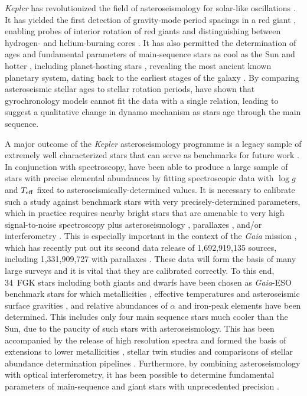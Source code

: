 \documentclass[a4paper,fleqn,usenatbib]{mnras}
\newcommand{\teff}{\mbox{$T_{\rm eff}$}\xspace}
\newcommand{\logg}{\mbox{$\log g$}\xspace}
\newcommand{\kepler}{\emph{Kepler}\xspace}
\newcommand{\gaia}{\emph{Gaia}\xspace}
\begin{document}
\kepler has revolutionized the field of asteroseismology for solar-like oscillations \citep{2010PASP..122..131G}. It has yielded the first detection of gravity-mode period spacings in a red giant \citep{rggmodes}, enabling probes of interior rotation of red giants \citep{rggmoderotation} and distinguishing between hydrogen- and helium-burning cores \citep{rggmodehelium}. It has also permitted the determination of ages and fundamental parameters of main-sequence stars as cool as the Sun and hotter \citep{silvaages}, including planet-hosting stars \citep{huberplanetages,silvaplanetages,2018MNRAS.479.4786V}, revealing the most ancient known planetary system, dating back to the earliest stages of the galaxy \citep{ancientplanets}. By comparing asteroseismic stellar ages to stellar rotation periods, \citet{angusgyro} have shown that gyrochronology models cannot fit the data with a single relation, leading \citet{vansadersgyro} to suggest a qualitative change in dynamo mechanism as stars age through the main sequence. 

A major outcome of the \kepler asteroseismology programme is a legacy sample of extremely well characterized stars that can serve as benchmarks for future work \citep{keplerlegacy1,keplerlegacy2}. In conjunction with spectroscopy, \citet{hawkinsapogee} have been able to produce a large sample of stars with precise elemental abundances by fitting spectroscopic data with \logg and \teff fixed to asteroseismically-determined values. It is necessary to calibrate such a study against benchmark stars with very precisely-determined parameters, which in practice requires nearby bright stars that are amenable to very high signal-to-noise spectroscopy plus asteroseismology \citep{creeveybenchmark}, parallaxes \citep{hawkinsbenchmarks}, and/or interferometry \citep{casagrandebenchmark,creeveybenchmark2}. This is especially important in the context of the \gaia mission \citep{gaia}, which has recently put out its second data release of 1,692,919,135 sources, including 1,331,909,727 with parallaxes \citep{gaiadr2}. These data will form the basis of many large surveys and it is vital that they are calibrated correctly. To this end, 34~FGK stars including both giants and dwarfs have been chosen as \gaia-ESO benchmark stars for which metallicities \citep{gaiabenchmark1}, effective temperatures and asteroseismic surface gravities \citep{gaiabenchmark3}, and relative abundances of $\alpha$ and iron-peak elements \citep{gaiabenchmark4} have been determined. This includes only four main sequence stars much cooler than the Sun, due to the paucity of such stars with asteroseismology. This has been accompanied by the release of high resolution spectra \citep{gaiabenchmark2} and formed the basis of extensions to lower metallicities \citep{gaiabenchmark5}, stellar twin studies \citep{gaiabenchmarktwins} and comparisons of stellar abundance determination pipelines \citep{gaiabenchmarkabundances}. Furthermore, by combining asteroseismology with optical interferometry, it has been possible to determine fundamental parameters of main-sequence and giant stars with unprecedented precision \citep{huber12,thetacygwhite,white15}. 
\end{document}
